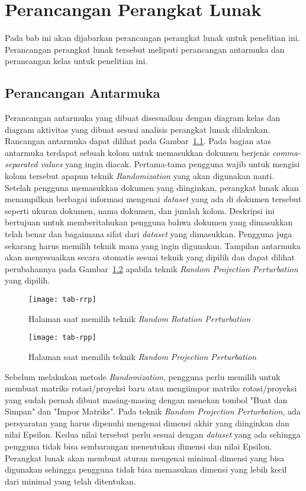 \chapter{Perancangan Perangkat Lunak}
\label{chap:perancangan}

Pada bab ini akan dijabarkan perancangan perangkat lunak untuk penelitian ini. Perancangan perangkat lunak tersebut meliputi perancangan antarmuka dan perancangan kelas untuk penelitian ini.

\section{Perancangan Antarmuka}
\label{sec:antarmuka}

Perancangan antarmuka yang dibuat disesuaikan dengan diagram kelas dan diagram aktivitas yang dibuat sesuai analisis perangkat lunak dilakukan. Rancangan antarmuka dapat dilihat pada Gambar~\ref{fig:tab-rrp}. Pada bagian atas antarmuka terdapat sebuah kolom untuk memasukkan dokumen berjenis \textit{comma-separated values} yang ingin diacak. Pertama-tama pengguna wajib untuk mengisi kolom tersebut apapun teknik \textit{Randomization} yang akan digunakan nanti. Setelah pengguna memasukkan dokumen yang diinginkan, perangkat lunak akan menampilkan berbagai informasi mengenai \textit{dataset} yang ada di dokumen tersebut seperti ukuran dokumen, nama dokumen, dan jumlah kolom. Deskripsi ini bertujuan untuk memberitahukan pengguna bahwa dokumen yang dimasukkan telah benar dan bagaimana sifat dari \textit{dataset} yang dimasukkan. Pengguna juga sekarang harus memilih teknik mana yang ingin digunakan. Tampilan antarmuka akan menyesuaikan secara otomatis sesuai teknik yang dipilih dan dapat dilihat perubahannya pada Gambar~\ref{fig:tab-rpp} apabila teknik \textit{Random Projection Perturbation} yang dipilih.

\begin{figure}
	\centering
	\texttt{[image: tab-rrp]}
	\caption{Halaman saat memilih teknik \textit{Random Rotation Perturbation}}
	\label{fig:tab-rrp}
\end{figure}

\begin{figure}
	\centering
	\texttt{[image: tab-rpp]}
	\caption{Halaman saat memilih teknik \textit{Random Projection Perturbation}}
	\label{fig:tab-rpp}
\end{figure}

Sebelum melakukan metode \textit{Randomization}, pengguna perlu memilih untuk membuat matriks rotasi/proyeksi baru atau mengiimpor matriks rotasi/proyeksi yang sudah pernah dibuat masing-masing dengan menekan tombol "Buat dan Simpan" dan "Impor Matriks". Pada teknik \textit{Random Projection Perturbation}, ada persyaratan yang harus dipenuhi mengenai dimensi akhir yang diinginkan dan nilai Epsilon. Kedua nilai tersebut perlu sesuai dengan \textit{dataset} yang ada sehingga pengguna tidak bisa sembarangan menentukan dimensi dan nilai Epsilon. Perangkat lunak akan membuat aturan mengenai minimal dimensi yang bisa digunakan sehingga pengguna tidak bisa memasukan dimensi yang lebih kecil dari minimal yang telah ditentukan.

